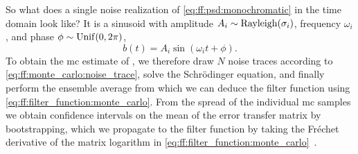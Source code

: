 So what does a single noise realization of \cref{eq:ff:psd:monochromatic} in the time domain look like?
It is a sinusoid with amplitude $A_i \sim\operatorname{Rayleigh}(\sigma_i)$,
frequency $\omega_i$, and phase $\phi \sim \operatorname{Unif}(0, 2\pi)$,
\begin{equation}\label{eq:ff:monte_carlo:noise_trace}
    b(t) = A_i\sin(\omega_i t + \phi).
\end{equation}
To obtain the \gls{mc} estimate of \liouvUetavg, we therefore draw $N$ noise traces according to \cref{eq:ff:monte_carlo:noise_trace}, solve the Schrödinger equation, and finally perform the ensemble average from which we can deduce the filter function using \cref{eq:ff:filter_function:monte_carlo}.
From the spread of the individual \gls{mc} samples we obtain confidence intervals on the mean of the error transfer matrix by bootstrapping, which we propagate to the filter function by taking the Fréchet derivative of the matrix logarithm in \cref{eq:ff:filter_function:monte_carlo}~\cite{Al-Mohy2013}.


